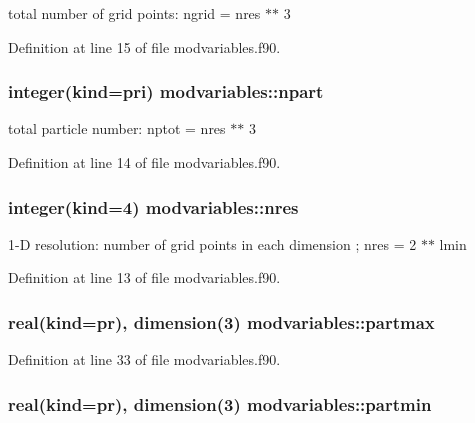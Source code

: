 total number of grid points\-: ngrid = nres $\ast$$\ast$ 3 



Definition at line 15 of file modvariables.\-f90.

\hypertarget{classmodvariables_a003cd4a3edf99a1c8f83cef4c61eb690}{
\subsubsection[{npart}]{\setlength{\rightskip}{0pt plus 5cm}integer(kind=pri) modvariables\-::npart}}\label{classmodvariables_a003cd4a3edf99a1c8f83cef4c61eb690}


total particle number\-: nptot = nres $\ast$$\ast$ 3 



Definition at line 14 of file modvariables.\-f90.

\hypertarget{classmodvariables_aa678ff0ebe26f3b0510eba5a59a69e61}{
\subsubsection[{nres}]{\setlength{\rightskip}{0pt plus 5cm}integer(kind=4) modvariables\-::nres}}\label{classmodvariables_aa678ff0ebe26f3b0510eba5a59a69e61}


1-\/\-D resolution\-: number of grid points in each dimension ; nres = 2 $\ast$$\ast$ lmin 



Definition at line 13 of file modvariables.\-f90.

\hypertarget{classmodvariables_abeabad3e2598f3abb4a4fa74adca7743}{
\subsubsection[{partmax}]{\setlength{\rightskip}{0pt plus 5cm}real(kind=pr), dimension(3) modvariables\-::partmax}}\label{classmodvariables_abeabad3e2598f3abb4a4fa74adca7743}


Definition at line 33 of file modvariables.\-f90.

\hypertarget{classmodvariables_a70ddcf7f533c219df5c249774ff81df1}{
\subsubsection[{partmin}]{\setlength{\rightskip}{0pt plus 5cm}real(kind=pr), dimension(3) modvariables\-::partmin}}\label{classmodvariables_a70ddcf7f533c219df5c249774ff81df1}


